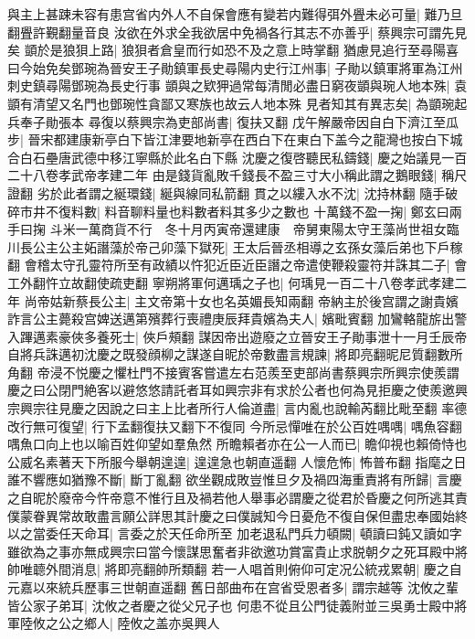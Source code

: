 與主上甚踈未容有患宫省内外人不自保會應有變若内難得弭外舋未必可量|{
	難乃旦翻舋許覲翻量音良}
汝欲在外求全我欲居中免禍各行其志不亦善乎|{
	蔡興宗可謂先見矣}
顗於是狼狽上路|{
	狼狽者倉皇而行如恐不及之意上時掌翻}
猶慮見追行至尋陽喜曰今始免矣鄧琬為晉安王子勛鎮軍長史尋陽内史行江州事|{
	子勛以鎮軍將軍為江州刺史鎮尋陽鄧琬為長史行事}
顗與之欵狎過常每清閒必盡日窮夜顗與琬人地本殊|{
	袁顗有清望又名門也鄧琬性貪鄙又寒族也故云人地本殊}
見者知其有異志矣|{
	為顗琬起兵奉子勛張本}
尋復以蔡興宗為吏部尚書|{
	復扶又翻}
戊午解嚴帝因自白下濟江至瓜步|{
	晉宋都建康新亭白下皆江津要地新亭在西白下在東白下盖今之龍灣也按白下城合白石壘唐武德中移江寧縣於此名白下縣}
沈慶之復啓聽民私鑄錢|{
	慶之始議見一百二十八卷孝武帝孝建二年}
由是錢貨亂敗千錢長不盈三寸大小稱此謂之鵝眼錢|{
	稱尺證翻}
劣於此者謂之綖環錢|{
	綖與線同私箭翻}
貫之以縷入水不沈|{
	沈持林翻}
隨手破碎市井不復料數|{
	料音聊料量也料數者料其多少之數也}
十萬錢不盈一掬|{
	鄭玄曰兩手曰掬}
斗米一萬商貨不行　冬十月丙寅帝還建康　帝舅東陽太守王藻尚世祖女臨川長公主公主妬譖藻於帝己卯藻下獄死|{
	王太后晉丞相導之玄孫女藻后弟也下戶稼翻}
會稽太守孔靈符所至有政績以忤犯近臣近臣譖之帝遣使鞭殺靈符并誅其二子|{
	會工外翻忤立故翻使疏吏翻}
寧朔將軍何邁瑀之子也|{
	何瑀見一百二十八卷孝武孝建二年}
尚帝姑新蔡長公主|{
	主文帝第十女也名英媚長知兩翻}
帝納主於後宫謂之謝貴嬪詐言公主薨殺宫婢送邁第殯葬行喪禮庚辰拜貴嬪為夫人|{
	嬪毗賓翻}
加鸞輅龍旂出警入蹕邁素豪俠多養死士|{
	俠戶頰翻}
謀因帝出遊廢之立晉安王子勛事泄十一月壬辰帝自將兵誅邁初沈慶之既發顔柳之謀遂自昵於帝數盡言規諫|{
	將即亮翻昵尼質翻數所角翻}
帝浸不悦慶之懼杜門不接賓客嘗遣左右范羨至吏部尚書蔡興宗所興宗使羨謂慶之曰公閉門絶客以避悠悠請託者耳如興宗非有求於公者也何為見拒慶之使羨邀興宗興宗往見慶之因說之曰主上比者所行人倫道盡|{
	言内亂也說輸芮翻比毗至翻}
率德改行無可復望|{
	行下孟翻復扶又翻下不復同}
今所忌憚唯在於公百姓喁喁|{
	喁魚容翻喁魚口向上也以喻百姓仰望如羣魚然}
所瞻賴者亦在公一人而已|{
	瞻仰視也賴倚恃也}
公威名素著天下所服今舉朝遑遑|{
	遑遑急也朝直遥翻}
人懷危怖|{
	怖普布翻}
指麾之日誰不響應如猶豫不斷|{
	斷丁亂翻}
欲坐觀成敗豈惟旦夕及禍四海重責將有所歸|{
	言慶之自昵於廢帝今忤帝意不惟行且及禍若他人舉事必謂慶之從君於昏慶之何所逃其責}
僕蒙眷異常故敢盡言願公詳思其計慶之曰僕誠知今日憂危不復自保但盡忠奉國始終以之當委任天命耳|{
	言委之於天任命所至}
加老退私門兵力頓闕|{
	頓讀曰鈍又讀如字}
雖欲為之事亦無成興宗曰當今懷謀思奮者非欲邀功賞富貴止求脱朝夕之死耳殿中將帥唯聼外間消息|{
	將即亮翻帥所類翻}
若一人唱首則俯仰可定况公統戎累朝|{
	慶之自元嘉以來統兵歷事三世朝直遥翻}
舊日部曲布在宫省受恩者多|{
	謂宗越等}
沈攸之輩皆公家子弟耳|{
	沈攸之者慶之從父兄子也}
何患不從且公門徒義附並三吳勇士殿中將軍陸攸之公之鄉人|{
	陸攸之盖亦吳興人}
